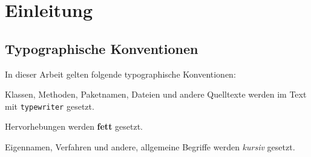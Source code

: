 \chapter{Einleitung}

\blindtext[2]

\section{Typographische Konventionen}
In dieser Arbeit gelten folgende typographische Konventionen:
\begin{compactitem}
\item Klassen, Methoden, Paketnamen, Dateien und andere Quelltexte werden im Text mit \texttt{typewriter} gesetzt.
\item Hervorhebungen werden \textbf{fett} gesetzt.
\item Eigennamen, Verfahren und andere, allgemeine Begriffe werden \textit{kursiv} gesetzt.
\end{compactitem}